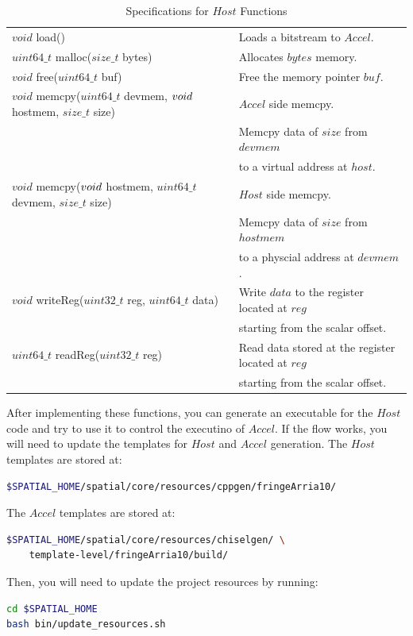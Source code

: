 \documentclass{article}
\begin{document}
\begin{table}[t]
\centering
\scriptsize
\begin{tabular}{ll}
   $void$ load() & Loads a bitstream to $Accel$. \\
   $uint64\_t$ malloc($size\_t$ bytes) & Allocates $bytes$ memory. \\
   $void$ free($uint64\_t$ buf) & Free the memory pointer $buf$. \\
   $void$ memcpy($uint64\_t$ devmem, $void\*$ hostmem, $size\_t$ size) & $Accel$ side memcpy. \\ 
   & Memcpy data of $size$ from $devmem$ \\
   & to a virtual address at $host$. \\
   $void$ memcpy($void\*$ hostmem, $uint64\_t$ devmem, $size\_t$ size) & $Host$ side memcpy. \\
   & Memcpy data of $size$ from $hostmem$ \\
   & to a physcial address at $devmem$. \\
   $void$ writeReg($uint32\_t$ reg, $uint64\_t$ data) & Write $data$ to the register located at $reg$ \\
   & starting from the scalar offset. \\
   $uint64\_t$ readReg($uint32\_t$ reg) & Read data stored at the register located at $reg$ \\
   & starting from the scalar offset.
\end{tabular}
  \caption{Specifications for $Host$ Functions}
  \label{API}
\end{table}

After implementing these functions, you can generate an executable for the $Host$ code and try to use it to control the executino of $Accel$.
If the flow works, you will need to update the templates for $Host$ and $Accel$ generation.
The $Host$ templates are stored at:
\begin{lstlisting}[language=bash]
$SPATIAL_HOME/spatial/core/resources/cppgen/fringeArria10/
\end{lstlisting}

The $Accel$ templates are stored at:
\begin{lstlisting}[language=bash]
$SPATIAL_HOME/spatial/core/resources/chiselgen/ \
    template-level/fringeArria10/build/
\end{lstlisting}

Then, you will need to update the project resources by running:
\begin{lstlisting}[language=bash]
cd $SPATIAL_HOME
bash bin/update_resources.sh
\end{lstlisting}
\end{document}

